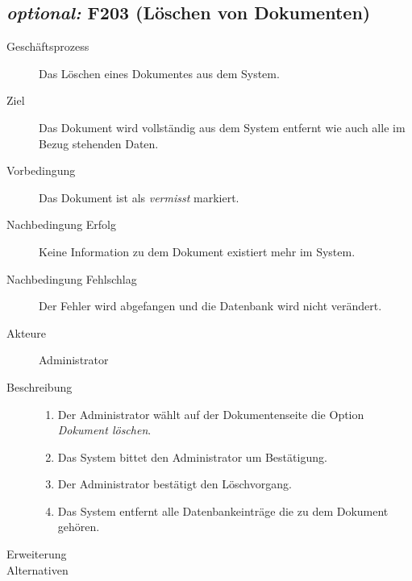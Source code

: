 \subsection{\emph{optional:} F203 (Löschen von Dokumenten)}
\label{F:Löschen}
\begin{description}
  \item[Geschäftsprozess]Das Löschen eines Dokumentes aus dem System.
  \item[Ziel]Das Dokument wird vollständig aus dem System entfernt wie auch alle im Bezug stehenden Daten.
  \item[Vorbedingung]Das Dokument ist als \emph{vermisst} markiert.
  \item[Nachbedingung Erfolg]Keine Information zu dem Dokument existiert mehr im System.
  \item[Nachbedingung Fehlschlag]Der Fehler wird abgefangen und die Datenbank wird nicht verändert.
  \item[Akteure]Administrator
  \item[Beschreibung]\hfill
    \begin{enumerate}
      \item Der Administrator wählt auf der Dokumentenseite die Option \emph{Dokument löschen}.
      \item Das System bittet den Administrator um Bestätigung.
      \item Der Administrator bestätigt den Löschvorgang.
      \item Das System entfernt alle Datenbankeinträge die zu dem Dokument gehören.
    \end{enumerate}
  \item[Erweiterung]
  \item[Alternativen]
\end{description}

